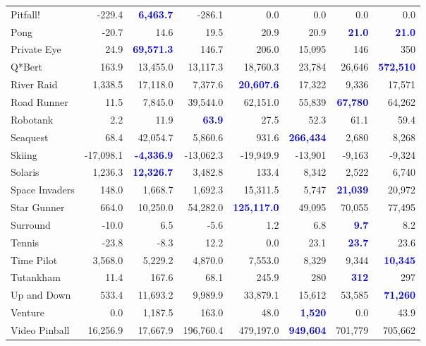 \documentclass[letterpaper]{article}
\begin{document}
\begin{figure*}
\begin{tabular}{ l | r|r|r|r|r|r| r }
Pitfall! & -229.4 & \textbf{\textcolor{blue}{6,463.7}} & -286.1 & 0.0 & 0.0 & 0.0 & 0.0 \\
Pong & -20.7 & 14.6 & 19.5 & 20.9 & 20.9 & \textbf{\textcolor{blue}{21.0}} & \textbf{\textcolor{blue}{21.0}} \\
Private Eye & 24.9 & \textbf{\textcolor{blue}{69,571.3}} & 146.7 & 206.0 & 15,095 & 146 & 350 \\
Q*Bert & 163.9 & 13,455.0 & 13,117.3 & 18,760.3 & 23,784 & 26,646 & \textbf{\textcolor{blue}{572,510}} \\
River Raid & 1,338.5 & 17,118.0 & 7,377.6 & \textbf{\textcolor{blue}{20,607.6}} & 17,322 & 9,336 & 17,571 \\
Road Runner & 11.5 & 7,845.0 & 39,544.0 & 62,151.0 & 55,839 & \textbf{\textcolor{blue}{67,780}} & 64,262 \\
Robotank & 2.2 & 11.9 & \textbf{\textcolor{blue}{63.9}} & 27.5 & 52.3 & 61.1 & 59.4 \\
Seaquest & 68.4 & 42,054.7 & 5,860.6 & 931.6 & \textbf{\textcolor{blue}{266,434}} & 2,680 & 8,268 \\
Skiing & -17,098.1 & \textbf{\textcolor{blue}{-4,336.9}} & -13,062.3 & -19,949.9 & -13,901 & -9,163 & -9,324 \\
Solaris & 1,236.3 & \textbf{\textcolor{blue}{12,326.7}} & 3,482.8 & 133.4 & 8,342 & 2,522 & 6,740 \\
Space Invaders & 148.0 & 1,668.7 & 1,692.3 & 15,311.5 & 5,747 & \textbf{\textcolor{blue}{21,039}} & 20,972 \\
Star Gunner & 664.0 & 10,250.0 & 54,282.0 & \textbf{\textcolor{blue}{125,117.0}} & 49,095 & 70,055 & 77,495 \\
Surround & -10.0 & 6.5 & -5.6 & 1.2 & 6.8 & \textbf{\textcolor{blue}{9.7}} & 8.2 \\
Tennis & -23.8 & -8.3 & 12.2 & 0.0 & 23.1 & \textbf{\textcolor{blue}{23.7}} & 23.6 \\
Time Pilot & 3,568.0 & 5,229.2 & 4,870.0 & 7,553.0 & 8,329 & 9,344 & \textbf{\textcolor{blue}{10,345}} \\
Tutankham & 11.4 & 167.6 & 68.1 & 245.9 & 280 & \textbf{\textcolor{blue}{312}} & 297 \\
Up and Down & 533.4 & 11,693.2 & 9,989.9 & 33,879.1 & 15,612 & 53,585 & \textbf{\textcolor{blue}{71,260}} \\
Venture & 0.0 & 1,187.5 & 163.0 & 48.0 & \textbf{\textcolor{blue}{1,520}} & 0.0 & 43.9 \\
Video Pinball & 16,256.9 & 17,667.9 & 196,760.4 & 479,197.0 & \textbf{\textcolor{blue}{949,604}} & 701,779 & 705,662 \\

\end{tabular}
\end{figure*}
\end{document}
